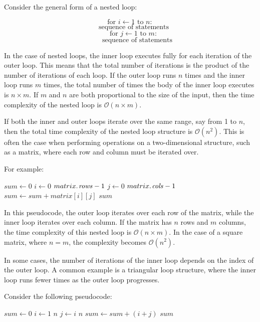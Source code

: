 Consider the general form of a nested loop:

\newpage

\[
\text{for } i \gets 1 \text{ to } n:
\]
\[
\quad \text{sequence of statements}
\]
\[
\quad \text{for } j \gets 1 \text{ to } m:
\]
\[
\quad\quad \text{sequence of statements}
\]

In the case of nested loops, the inner loop executes fully for each iteration of the outer loop. This means that the total number of iterations is the product of the number of iterations of each loop. If the outer loop runs $n$ times and the inner loop runs $m$ times, the total number of times the body of the inner loop executes is $n \times m$. If $m$ and $n$ are both proportional to the size of the input, then the time complexity of the nested loop is $\mathcal{O}(n \times m)$. 

If both the inner and outer loops iterate over the same range, say from 1 to $n$, then the total time complexity of the nested loop structure is $\mathcal{O}(n^2)$. This is often the case when performing operations on a two-dimensional structure, such as a matrix, where each row and column must be iterated over.

For example:

\begin{codebox}
    \li $sum \gets 0$
    \li \For $i \gets 0$ \To $\attrib{matrix}{rows} - 1$ \Do
    \li     \For $j \gets 0$ \To $\attrib{matrix}{cols} - 1$ \Do
    \li         $sum \gets sum + matrix[i][j]$
            \End
        \End
    \li \Return $sum$
\end{codebox}

In this pseudocode, the outer loop iterates over each row of the matrix, while the inner loop iterates over each column. If the matrix has $n$ rows and $m$ columns, the time complexity of this nested loop is $\mathcal{O}(n \times m)$. In the case of a square matrix, where $n = m$, the complexity becomes $\mathcal{O}(n^2)$.

In some cases, the number of iterations of the inner loop depends on the index of the outer loop. A common example is a triangular loop structure, where the inner loop runs fewer times as the outer loop progresses.

Consider the following pseudocode:

\begin{codebox}
    \li $sum \gets 0$
    \li \For $i \gets 1$ \To $n$ \Do
    \li     \For $j \gets i$ \To $n$ \Do
    \li         $sum \gets sum + (i + j)$
            \End
        \End
    \li \Return $sum$
\end{codebox}

